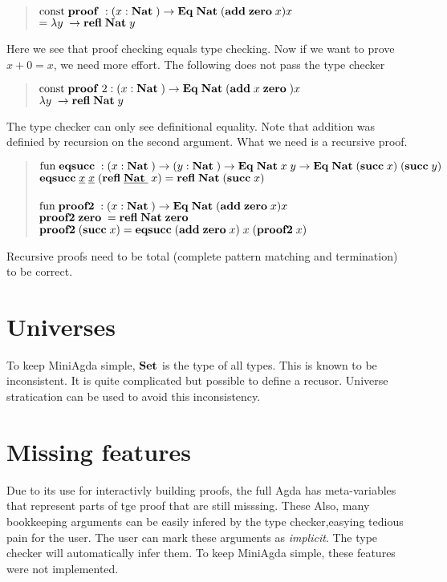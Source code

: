 \begin{quote}
$ \mathrm{const}\; \mathbf{proof}\; : ( x : \mathbf{Nat}\; ) \rightarrow \mathbf{Eq}\; \mathbf{Nat}\; (\mathbf{add}\; \mathbf{zero}\; x) x $ \\ 
$ = \lambda y\; \rightarrow \mathbf{refl}\; \mathbf{Nat}\; y$ 
\end{quote}
Here we see that proof checking equals type checking.
Now if we want to prove $ x + 0 = x $, we need more effort.
The following does not pass the type checker
\begin{quote}
$ \mathrm{const}\; \mathbf{proof}\;2 : ( x : \mathbf{Nat}\; ) \rightarrow \mathbf{Eq}\; \mathbf{Nat}\; (\mathbf{add}\; x \; \mathbf{zero}\;)  x $ \\ 
$ \lambda y\; \rightarrow \mathbf{refl}\; \mathbf{Nat}\; y$ 
\end{quote}
The type checker can only see definitional equality.
Note that addition was definied by recursion on the second argument. 
What we need is a recursive proof.
\begin{quote}
$\mathrm{fun}\; \mathbf{eqsucc}\; : ( x : \mathbf{Nat}\; ) \rightarrow ( y : \mathbf{Nat}\; ) \rightarrow \mathbf{Eq}\; \mathbf{Nat}\; x \; y \rightarrow \mathbf{Eq}\; \mathbf{Nat}\; (\mathbf{succ}\; x) \; (\mathbf{succ}\; y)$ \\
$\mathbf{eqsucc}\; \underline{x} \; \underline{x} \; (\mathbf{refl}\; \underline{\mathbf{Nat}\;} \; x) = \mathbf{refl}\; \mathbf{Nat}\; (\mathbf{succ}\; x)$
\\
\\
$\mathrm{fun}\; \mathbf{proof2}\; : ( x : \mathbf{Nat}\; ) \rightarrow \mathbf{Eq}\; \mathbf{Nat}\; (\mathbf{add}\; \mathbf{zero}\; x) x$
\\
$\mathbf{proof2}\; \mathbf{zero}\; = \mathbf{refl}\; \mathbf{Nat}\; \mathbf{zero}\;$
\\
$\mathbf{proof2}\; (\mathbf{succ}\; x) = \mathbf{eqsucc}\; (\mathbf{add}\; \mathbf{zero}\; x)\; x \; (\mathbf{proof2}\; x)$
\end{quote}
Recursive proofs need to be total (complete pattern matching and termination) to be correct.

\section{Universes}
To keep MiniAgda simple, $\mathbf{Set}$ is the type of all types.
This is known to be inconsistent.
It is quite complicated but possible to define a recusor.
Universe stratication can be used to avoid this inconsistency.

\section{Missing features}
Due to its use for interactivly building proofs, the full Agda has meta-variables that represent parts of tge proof that are still misssing. These 
Also, many bookkeeping arguments can be easily infered by the type checker,easying tedious pain for the user.
The user can mark these arguments as \emph{implicit}. The type checker will automatically infer them.
To keep MiniAgda simple, these features were not implemented.

